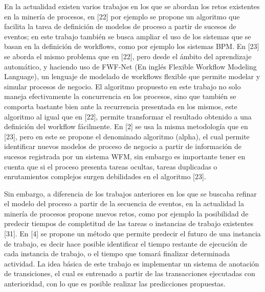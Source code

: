 En la actualidad existen varios trabajos en los que se abordan los retos existentes en la minería de procesos, en [22] por ejemplo se propone un algoritmo que facilita la tarea de definición de modelos de proceso a partir de sucesos de eventos; en este trabajo también se busca ampliar el uso de los sistemas que se basan en la definición de workflows, como por ejemplo los sistemas BPM. En [23] se aborda el mismo problema que en [22], pero desde el ámbito del aprendizaje automático, y haciendo uso de FWF-Net (En inglés Flexible Workflow Modeling Language), un lenguaje de modelado de workflows flexible que permite modelar y simular procesos de negocio. El algoritmo propuesto en este trabajo no solo maneja efectivamente la concurrencia en los procesos, sino que también se comporta bastante bien ante la recurrencia presentada en los mismos, este algoritmo al igual que en [22], permite transformar el resultado obtenido a una definición del workflow fácilmente. En [2] se usa la misma metodología que en [23], pero en este se propone el denominado algoritmo (alpha), el cual permite identificar nuevos modelos de proceso de negocio a partir de información de sucesos registrada por un sistema WFM, sin embargo es importante tener en cuenta que si el proceso presenta tareas ocultas, tareas duplicadas o enrutamientos complejos surgen debilidades en el algoritmo [23].

Sin embargo, a diferencia de los trabajos anteriores en los que se buscaba refinar el modelo del proceso a partir de la secuencia de eventos, en la actualidad la minería de procesos propone nuevos retos, como por ejemplo la posibilidad de predecir tiempos de completitud de las tareas o instancias de trabajo existentes [31]. En [4] se propone un método que permite predecir el futuro de una instancia de trabajo, es decir hace posible identificar el tiempo restante de ejecución de cada instancia de trabajo, o el tiempo que tomará finalizar determinada actividad. La idea básica de este trabajo es implementar un sistema de anotación de transiciones, el cual es entrenado a partir de las transacciones ejecutadas con anterioridad, con lo que es posible realizar las predicciones propuestas.

